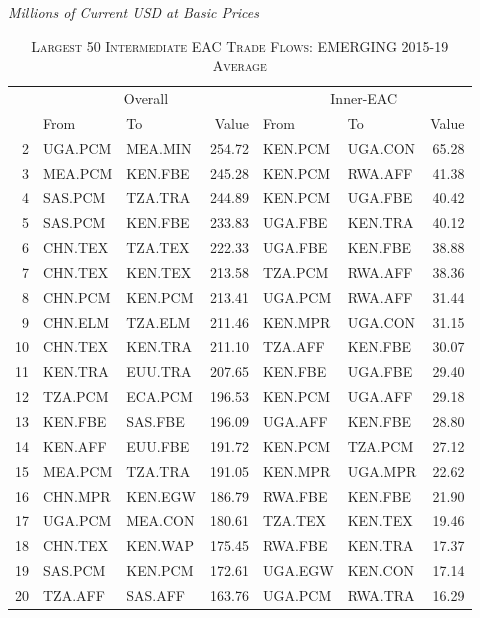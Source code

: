 \documentclass[a4paper]{article}
\begin{document}
\begin{table}[ht]
\centering
  \caption{\label{tab:weaclfl}\textsc{Largest 50 Intermediate EAC Trade Flows: EMERGING 2015-19 Average}} 
  \small{\textit{Millions of Current USD at Basic Prices}}
\begin{tabular}{rllrllr}
  \toprule
 & \multicolumn{3}{c}{Overall} & \multicolumn{3}{c}{Inner-EAC} \\
 & From & To & Value & From & To & Value \\ 
  \midrule
  2 & UGA.PCM & MEA.MIN & 254.72 & KEN.PCM & UGA.CON & 65.28 \\ 
  3 & MEA.PCM & KEN.FBE & 245.28 & KEN.PCM & RWA.AFF & 41.38 \\ 
  4 & SAS.PCM & TZA.TRA & 244.89 & KEN.PCM & UGA.FBE & 40.42 \\ 
  5 & SAS.PCM & KEN.FBE & 233.83 & UGA.FBE & KEN.TRA & 40.12 \\ 
  6 & CHN.TEX & TZA.TEX & 222.33 & UGA.FBE & KEN.FBE & 38.88 \\ 
  7 & CHN.TEX & KEN.TEX & 213.58 & TZA.PCM & RWA.AFF & 38.36 \\ 
  8 & CHN.PCM & KEN.PCM & 213.41 & UGA.PCM & RWA.AFF & 31.44 \\ 
  9 & CHN.ELM & TZA.ELM & 211.46 & KEN.MPR & UGA.CON & 31.15 \\ 
  10 & CHN.TEX & KEN.TRA & 211.10 & TZA.AFF & KEN.FBE & 30.07 \\ 
  11 & KEN.TRA & EUU.TRA & 207.65 & KEN.FBE & UGA.FBE & 29.40 \\ 
  12 & TZA.PCM & ECA.PCM & 196.53 & KEN.PCM & UGA.AFF & 29.18 \\ 
  13 & KEN.FBE & SAS.FBE & 196.09 & UGA.AFF & KEN.FBE & 28.80 \\ 
  14 & KEN.AFF & EUU.FBE & 191.72 & KEN.PCM & TZA.PCM & 27.12 \\ 
  15 & MEA.PCM & TZA.TRA & 191.05 & KEN.MPR & UGA.MPR & 22.62 \\ 
  16 & CHN.MPR & KEN.EGW & 186.79 & RWA.FBE & KEN.FBE & 21.90 \\ 
  17 & UGA.PCM & MEA.CON & 180.61 & TZA.TEX & KEN.TEX & 19.46 \\ 
  18 & CHN.TEX & KEN.WAP & 175.45 & RWA.FBE & KEN.TRA & 17.37 \\ 
  19 & SAS.PCM & KEN.PCM & 172.61 & UGA.EGW & KEN.CON & 17.14 \\ 
  20 & TZA.AFF & SAS.AFF & 163.76 & UGA.PCM & RWA.TRA & 16.29 \\ 

\end{tabular}
\end{table}
\end{document}
